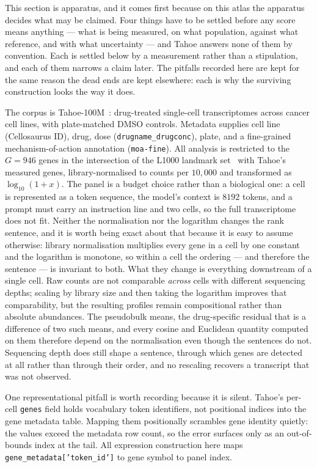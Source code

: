 This section is apparatus, and it comes first because on this atlas the apparatus decides what may
be claimed. Four things have to be settled before any score means anything --- what is being
measured, on what population, against what reference, and with what uncertainty --- and Tahoe
answers none of them by convention. Each is settled below by a measurement rather than a
stipulation, and each of them narrows a claim later. The pitfalls recorded here are
kept for the same reason the dead ends are kept elsewhere: each is why the surviving construction
looks the way it does.

The corpus is Tahoe-100M~\cite{tahoe100m}: drug-treated single-cell transcriptomes across cancer
cell lines, with plate-matched DMSO controls. Metadata supplies cell line (Cellosaurus ID), drug,
dose (\texttt{drugname\_drugconc}), plate, and a fine-grained mechanism-of-action annotation
(\texttt{moa-fine}). All analysis is restricted to the $G = 946$ genes in the intersection of the
L1000 landmark set~\cite{l1000} with Tahoe's measured genes, library-normalised to counts per
$10{,}000$ and transformed as $\log_{10}(1 + x)$. The panel is a budget choice rather than a
biological one: a cell is represented as a token sequence, the model's context is $8192$ tokens, and
a prompt must carry an instruction line and two cells, so the full transcriptome does not fit.
Neither the normalisation nor the logarithm changes the rank sentence, and it is worth being exact about that because it is easy
to assume otherwise: library normalisation multiplies every gene in a cell by one constant and the
logarithm is monotone, so within a cell the ordering --- and therefore the sentence --- is invariant
to both. What they change is everything downstream of a single cell. Raw counts are not comparable
\emph{across} cells with different sequencing depths; scaling by library size and then taking the
logarithm improves that comparability, but the resulting profiles remain compositional rather than
absolute abundances. The pseudobulk means, the drug-specific residual that is a difference of two
such means, and every cosine and Euclidean quantity computed on them therefore depend on the
normalisation even though the sentences do not. Sequencing depth does still shape a sentence,
through which genes are detected at all rather than through their order, and no rescaling recovers a
transcript that was not observed.

One representational pitfall is worth recording because it is silent. Tahoe's per-cell
\texttt{genes} field holds vocabulary token identifiers, not positional indices into the gene
metadata table. Mapping them positionally scrambles gene identity quietly: the values exceed the
metadata row count, so the error surfaces only as an out-of-bounds index at the tail. All expression
construction here maps \texttt{gene\_metadata['token\_id']} to gene symbol to panel index.

